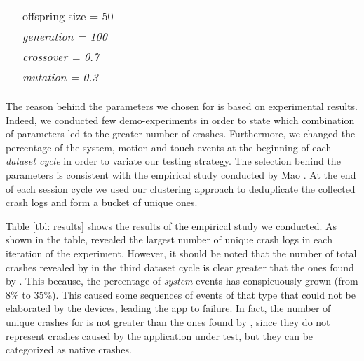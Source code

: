 \begin{table}[tb]
\begin{tabular}{l|l|}
                                                                              & offspring size = 50                                                     \\ \cline{2-2} 
                                                                              & \textit{generation = 100}                                               \\ \cline{2-2} 
                                                                              & \textit{crossover = 0.7}                                                \\ \cline{2-2} 
                                                                              & \textit{mutation = 0.3}                                                 \\ \cline{2-2} 
\end{tabular}
\end{table}

The reason behind the parameters we chosen for \monkey is based on experimental results. Indeed, we conducted few demo-experiments in order to state which combination of parameters led to the greater number of crashes. 
Furthermore, we changed the percentage of the system, motion and touch events at the beginning of each \textit{dataset cycle} in order to variate our testing strategy. 
The selection behind the \sapienz parameters is consistent with the empirical study conducted by Mao \etal \cite{sapienz}.  
At the end of each {session cycle} we used our clustering approach to deduplicate the collected crash logs and form a bucket of unique ones. 


Table \ref{tbl: results} shows the results of the empirical study we conducted. 
As shown in the table, \sapienz revealed the largest number of unique crash logs in each iteration of the experiment. 
However, it should be noted that the number of total crashes revealed by \monkey in the third dataset cycle is clear greater that the ones found by \sapienz. 
This because, the percentage of \textit{system} events has conspicuously grown (from 8\% to 35\%). This caused some sequences of events of that type that could not be elaborated by the devices, leading the app to failure. 
In fact, the number of unique crashes for \monkey is not greater than the ones found by \sapienz, since they do not represent crashes caused by the application under test, but they can be categorized as native crashes. 

